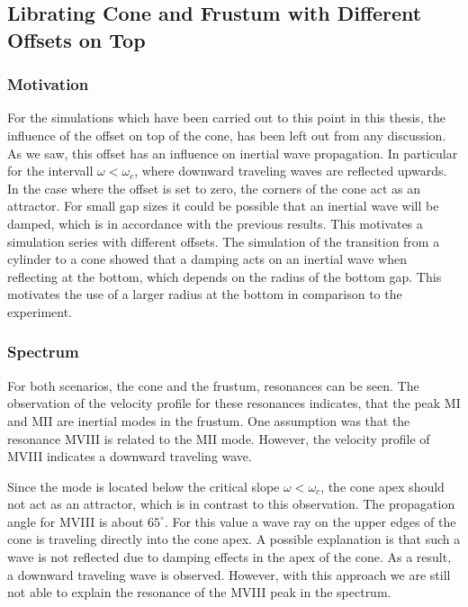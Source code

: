 \clearpage

\subsection{Librating Cone and Frustum with Different Offsets on Top}

\subsubsection{Motivation}

For the simulations which have been carried out to this point in this thesis,
the influence of the offset on top of the cone, has been left out from any discussion.
As we saw, this offset has an influence on inertial wave propagation.
In particular for the intervall $\omega<\omega_c$, where  downward traveling waves are
reflected upwards.
In the case where the offset is set to zero, the corners of the cone act as an attractor.
For small gap sizes it could be possible that an inertial wave will be damped,
which is in accordance with the previous results.
This motivates a simulation series with different offsets.
The simulation of the transition from a cylinder to a cone showed
that a damping acts on an inertial wave when reflecting at the bottom,
which  depends on the radius of the bottom gap.
This motivates the use of a larger radius at the bottom in comparison to the experiment.

\subsubsection{Spectrum}

For both scenarios, the cone and the frustum, resonances can be seen.
The observation of the velocity profile for these resonances indicates,
that the peak M\RN{1} and M\RN{2} are inertial modes in the frustum.
One assumption was that the resonance M\RN{8} is related to the M\RN{2} mode.
However, the velocity profile of M\RN{8} indicates a downward traveling wave.

Since the mode is located below the critical slope $\omega < \omega_c$, the cone apex
should not act as an attractor, which is in contrast to this observation.
The propagation angle for M\RN{8} is about $65^\circ$.
For this value a wave ray on the upper edges of the cone is traveling directly
into the cone apex.
A possible explanation is that such a wave is not reflected due to damping effects in
the apex of the cone. As a result, a downward traveling wave is observed.
However, with this approach we are still not able to explain the resonance of the M\RN{8} peak
in the spectrum.

